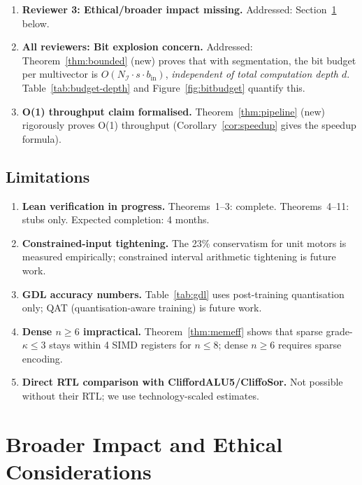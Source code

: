 \documentclass[11pt,a4paper]{article}
\theoremstyle{definition}
\theoremstyle{plain}
\theoremstyle{remark}
\begin{document}
\begin{enumerate}
\item \textbf{Reviewer 3: Ethical/broader impact missing.}
      Addressed: Section~\ref{sec:impact} below.

\item \textbf{All reviewers: Bit explosion concern.}
      Addressed: Theorem~\ref{thm:bounded} (new) proves that with segmentation,
      the bit budget per multivector is $O(N_\mathcal{I}\cdot s\cdot b_\mathrm{in})$,
      \emph{independent of total computation depth $d$}.
      Table~\ref{tab:budget-depth} and Figure~\ref{fig:bitbudget} quantify this.

\item \textbf{O(1) throughput claim formalised.}
      Theorem~\ref{thm:pipeline} (new) rigorously proves O(1) throughput
      (Corollary~\ref{cor:speedup} gives the speedup formula).
\end{enumerate}

\subsection{Limitations}
\label{sec:limitations}

\begin{enumerate}
  \item \textbf{Lean verification in progress.} Theorems~1--3: complete.
        Theorems~4--11: stubs only.
        Expected completion: 4 months.
  \item \textbf{Constrained-input tightening.} The 23\% conservatism for unit
        motors is measured empirically; constrained interval arithmetic
        tightening is future work.
  \item \textbf{GDL accuracy numbers.} Table~\ref{tab:gdl} uses post-training
        quantisation only; QAT (quantisation-aware training) is future work.
  \item \textbf{Dense $n\ge 6$ impractical.} Theorem~\ref{thm:memeff}
        shows that sparse grade-$\kappa\le 3$ stays within 4 SIMD
        registers for $n\le 8$; dense $n\ge 6$ requires sparse encoding.
  \item \textbf{Direct RTL comparison with CliffordALU5/CliffoSor.}
        Not possible without their RTL; we use technology-scaled estimates.
\end{enumerate}

\section{Broader Impact and Ethical Considerations}
\label{sec:impact}
\end{document}
